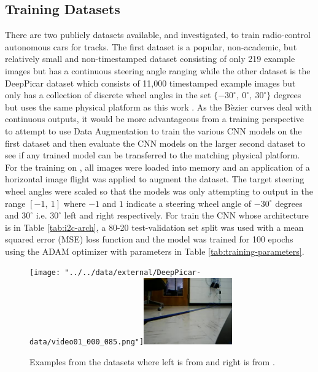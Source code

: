 \documentclass[conference]{IEEEtran}
\begin{document}
\subsection{Training Datasets}


There are two publicly datasets available, and investigated, to train radio-control autonomous cars for tracks. The first dataset is a popular, non-academic, but relatively small and non-timestamped dataset consisting of only 219 example images but has a continuous steering angle ranging \cite{tian2019} while the other dataset is the DeepPicar dataset which consists of 11,000 timestamped example images but only has a collection of discrete wheel angles in the set $\lbrace -30^\circ,\ 0^\circ,\ 30^\circ \rbrace$ degrees but uses the same physical platform as this work \cite{bechtel2018}. As the B\`ezier curves deal with continuous outputs, it would be more advantageous from a training perspective to attempt to use Data Augmentation to train the various CNN models on the first dataset and then evaluate the CNN models on the larger second dataset to see if any trained model can be transferred to the matching physical platform. For the training on \cite{tian2019}, all images were loaded into memory and an application of a horizontal image flight was applied to augment the dataset. The target steering wheel angles were scaled so that the models was only attempting to output in the range $[-1,\ 1]$ where $-1$ and $1$ indicate a steering wheel angle of $-30^\circ$ degrees and $30^\circ$ i.e. $30^\circ$ left and right respectively. For train the CNN whose architecture is in Table \ref{tab:i2c-arch}, a 80-20 test-validation set split was used with a mean squared error (MSE) loss function and the model was trained for 100 epochs using the ADAM optimizer with parameters in Table \ref{tab:training-parameters}.

\begin{figure}[tbhp]
	\centerline{\texttt{[image: "../../data/external/DeepPicar-data/video01\_000\_085.png"]}\hspace*{0.1in}\includegraphics[width=1.5in]{../figures/presentation/out-video-1-moment.jpg}}
	\caption{Examples from the datasets where left is from \cite{tian2019} and right is from \cite{bechtel2018}.}
\end{figure}
\end{document}
